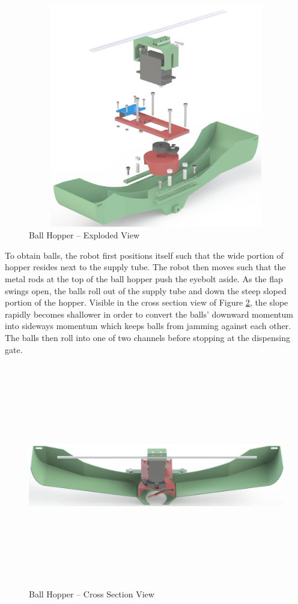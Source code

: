 \begin{figure}[H]   %
	\centering \includegraphics[width=6in, height=3.85in, keepaspectratio]{figures/ball_hopper_explode.png}
	\caption{Ball Hopper -- Exploded View}	\label{fig:ball_hopper_explode}
\end{figure}

To obtain balls, the robot first positions itself such that the wide portion of hopper resides next to the supply tube. The robot then moves such that the metal rods at the top of the ball hopper push the eyebolt aside. As the flap swings open, the balls roll out of the supply tube and down the steep sloped portion of the hopper. Visible in the cross section view of Figure \ref{fig:ball_hopper_xsec}, the slope rapidly becomes shallower in order to convert the balls' downward momentum into sideways momentum which keeps balls from jamming against each other. The balls then roll into one of two channels before stopping at the dispensing gate.

\begin{figure}[H]   %
	\centering \includegraphics[width=6in, height=3.85in, keepaspectratio]{figures/ball_hopper_xsec.png}
	\caption{Ball Hopper -- Cross Section View}	\label{fig:ball_hopper_xsec}
\end{figure}


